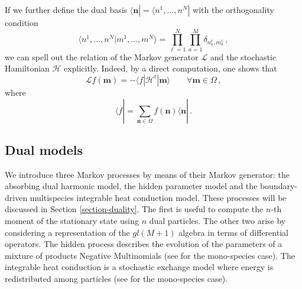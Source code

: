 \documentclass[11pt]{article}
\numberwithin{equation}{section}
\newcommand{\eH}{\mathcal{H}}
\begin{document}
If we further define the dual basis $\langle \bm{n}|=\langle n^1,\ldots,n^N|$ with the orthogonality condition
\begin{equation}
\langle n^1,\ldots,n^N|m^1,\ldots,m^N\rangle=\prod_{\ell=1}^N\prod_{a=1}^M\delta_{n^\ell_a,m^\ell_a}\,,
\end{equation}
we can spell out the relation of the Markov generator $\mathcal{L}$ and the stochastic Hamiltonian $\eH$ explicitly.
Indeed, by a direct computation, one shows that
\begin{equation}\label{gen-ham1}
    \mathcal{L}f(\bm{m})=-\langle f|\eH^t|\bm{m}\rangle \qquad\forall\bm{m}\in \Omega\,,
\end{equation}
where
\begin{equation}\label{gen-ham2}
    \langle f|=\sum_{\bm{n}\in \Omega} f(\bm{n})\langle \bm{n}|\,.
\end{equation}













\subsection{Dual models}\label{subsection-relatedModels}
We introduce three Markov processes by means of their Markov generator: the absorbing dual harmonic model, the hidden parameter model and the boundary-driven multispecies integrable heat conduction model. These processes
will be discussed in Section \ref{section-duality}.
The first is useful to 
compute the $n$-th moment
of the stationary state 
using $n$ dual particles.
The other two arise by considering a representation of the $gl(M+1)$ algebra in terms of differential operators.
The hidden process describes
the evolution of the parameters of a mixture of
products Negative Multinomials (see \cite{2025JSP...192...21G} for the mono-species case).
The integrable heat conduction is a stochastic exchange model where energy
is redistributed among particles (see \cite{Franceschini:2022vmr} for the mono-species case).
\end{document}
